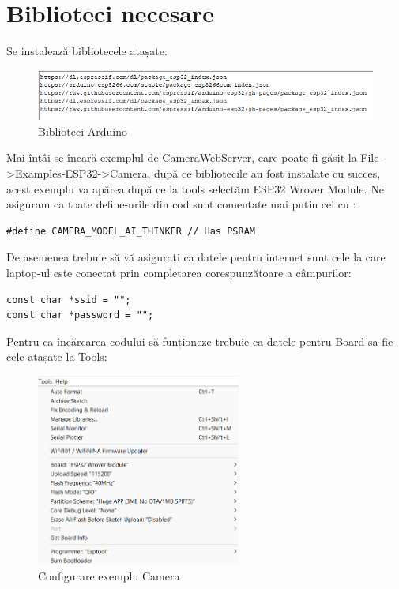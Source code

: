 \documentclass{report}
\begin{document}
\section{Biblioteci necesare}
Se instalează bibliotecele atașate:
\begin{figure}[H]
    \centering
    \includegraphics[width=1\textwidth]{biblioteci.png}
    \caption{Biblioteci Arduino}
    \label{fig:biblioteci}
\end{figure}
Mai întâi se încară exemplul de CameraWebServer, care poate fi găsit la File->Examples-ESP32->Camera, după ce bibliotecile au fost instalate cu succes, acest exemplu va apărea după ce la tools selectăm ESP32 Wrover Module. Ne asiguram ca toate define-urile din cod sunt comentate mai putin cel cu : \begin{lstlisting}
#define CAMERA_MODEL_AI_THINKER // Has PSRAM
\end{lstlisting}
De asemenea trebuie să vă asigurați ca datele pentru internet sunt cele la care laptop-ul este conectat prin completarea corespunzătoare a câmpurilor:
\begin{lstlisting}
const char *ssid = "";
const char *password = "";
\end{lstlisting}
\newpage
\vspace*{1cm}
Pentru ca încărcarea codului să funționeze trebuie ca datele pentru Board sa fie cele atașate la Tools:
\begin{figure}[H]
    \centering
    \includegraphics[width=0.6\textwidth]{cameraWebServer_tools.png}
    \caption{Configurare exemplu Camera}
    \label{fig:cameraWebServer_tools}
\end{figure}
\end{document}
